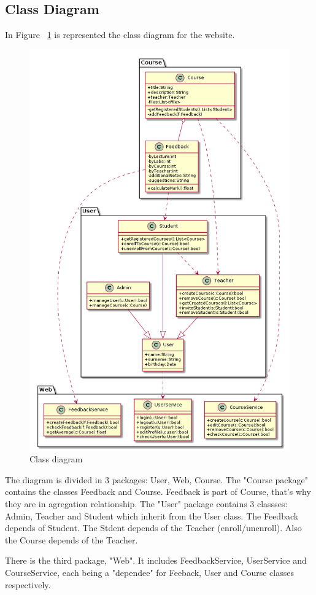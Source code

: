 \documentclass[12pt,a4paper,titlepage]{article}
\begin{document}
\subsection{Class Diagram}
In Figure ~\ref{fig:5class} is represented the class diagram for the website.
\begin{figure}[H]
	\centering
	\includegraphics[width=15cm]{5class}
	\caption{Class diagram}
	\label{fig:5class}
\end{figure}
The diagram is divided in 3 packages: User, Web, Course. The "Course package" contains the classes Feedback and Course. Feedback is part of Course, that's why they are in agregation relationship. The "User" package contains 3 classses: Admin, Teacher and Student which inherit from the User class. The Feedback depends of Student. The Stdent depends of the Teacher (enroll/unenroll). Also the Course depends of the Teacher.\par
There is the third package, "Web". It includes FeedbackService, UserService and CourseService, each being a "dependee" for Feeback, User and Course classes respectively.
\end{document}
